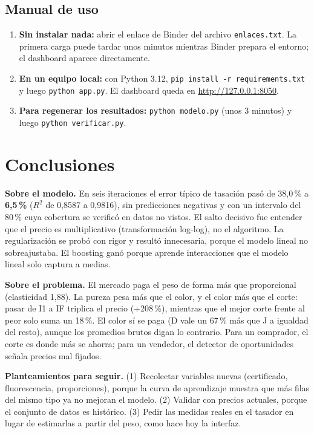 \documentclass[12pt,letterpaper]{article}
\begin{document}
\subsection{Manual de uso}

\begin{enumerate}[leftmargin=1.2cm,itemsep=0.2em]
\item \textbf{Sin instalar nada:} abrir el enlace de Binder del archivo
\texttt{enlaces.txt}. La primera carga puede tardar unos minutos mientras Binder
prepara el entorno; el dashboard aparece directamente.
\item \textbf{En un equipo local:} con Python 3.12,
\texttt{pip install -r requirements.txt} y luego \texttt{python app.py}. El
dashboard queda en \url{http://127.0.0.1:8050}.
\item \textbf{Para regenerar los resultados:} \texttt{python modelo.py} (unos 3
minutos) y luego \texttt{python verificar.py}.
\end{enumerate}

\section{Conclusiones}

\textbf{Sobre el modelo.} En seis iteraciones el error típico de tasación pasó
de 38,0\,\% a \textbf{6,5\,\%} ($R^2$ de 0,8587 a 0,9816), sin predicciones
negativas y con un intervalo del 80\,\% cuya cobertura se verificó en datos no
vistos. El salto decisivo fue entender que el precio es multiplicativo
(transformación log-log), no el algoritmo. La regularización se probó con rigor y
resultó innecesaria, porque el modelo lineal no sobreajustaba. El boosting ganó
porque aprende interacciones que el modelo lineal solo captura a medias.

\textbf{Sobre el problema.} El mercado paga el peso de forma más que
proporcional (elasticidad 1,88). La pureza pesa más que el color, y el color más
que el corte: pasar de I1 a IF triplica el precio (+208\,\%), mientras que el
mejor corte frente al peor solo suma un 18\,\%. El color sí se paga (D vale un
67\,\% más que J a igualdad del resto), aunque los promedios brutos digan lo
contrario. Para un comprador, el corte es donde más se ahorra; para un vendedor,
el detector de oportunidades señala precios mal fijados.

\textbf{Planteamientos para seguir.} (1) Recolectar variables nuevas
(certificado, fluorescencia, proporciones), porque la curva de aprendizaje
muestra que más filas del mismo tipo ya no mejoran el modelo. (2) Validar con
precios actuales, porque el conjunto de datos es histórico. (3) Pedir las medidas
reales en el tasador en lugar de estimarlas a partir del peso, como hace hoy la
interfaz.
\end{document}
